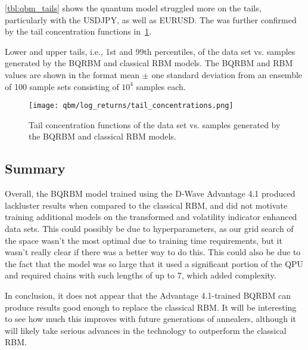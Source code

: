 \cref{tbl:qbm_tails} shows the quantum model struggled more on the tails, particularly with the USDJPY, as well as EURUSD.
The was further confirmed by the tail concentration functions in~\cref{fig:qbm_log_returns_tail_concentrations}.
\begin{table}[!htb]
    \centering
    \begin{adjustbox}{max width=\textwidth}
        
    \end{adjustbox}
    \caption{
        Lower and upper tails, i.e., 1st and 99th percentiles, of the data set vs. samples generated by the BQRBM and classical RBM models.
        The BQRBM and RBM values are shown in the format mean \(\pm\) one standard deviation from an ensemble of 100 sample sets consisting of \( 10^4 \) samples each.
    }
    \label{tbl:qbm_tails}
\end{table}

\begin{figure}[!htb]
    \begin{center}
        \texttt{[image: qbm/log\_returns/tail\_concentrations.png]}
    \end{center}
    \caption{Tail concentration functions of the data set vs. samples generated by the BQRBM and classical RBM models.}
    \label{fig:qbm_log_returns_tail_concentrations}
\end{figure}

\subsection{Summary}
Overall, the BQRBM model trained using the D-Wave Advantage 4.1 produced lackluster results when compared to the classical RBM, and did not motivate training additional models on the transformed and volatility indicator enhanced data sets.
This could possibly be due to hyperparameters, as our grid search of the space wasn't the most optimal due to training time requirements, but it wasn't really clear if there was a better way to do this.
This could also be due to the fact that the model was so large that it used a significant portion of the QPU and required chains with such lengths of up to 7, which added complexity.

In conclusion, it does not appear that the Advantage 4.1-trained BQRBM can produce results good enough to replace the classical RBM.
It will be interesting to see how much this improves with future generations of annealers, although it will likely take serious advances in the technology to outperform the classical RBM.

